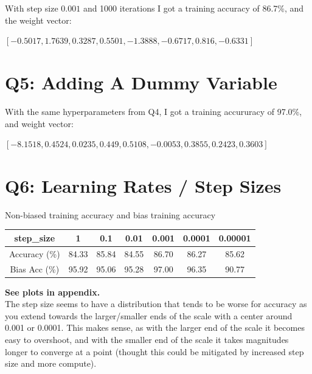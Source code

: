 \documentclass{article}
\begin{document}
        With step size $0.001$ and 1000 iterations I got a training accuracy of 86.7\%, and the weight vector: 
        \begin{center}
            $[-0.5017, 1.7639, 0.3287, 0.5501, -1.3888, -0.6717, 0.816, -0.6331]$
        \end{center}

    \section*{Q5: Adding A Dummy Variable}

        With the same hyperparameters from Q4, I got a training accururacy of 97.0\%, and weight vector:
        \begin{center}
            $[-8.1518, 0.4524, 0.0235, 0.449, 0.5108, -0.0053, 0.3855, 0.2423, 0.3603]$
        \end{center}

    \clearpage
    \section*{Q6: Learning Rates / Step Sizes}
        
        \begin{center}
            Non-biased training accuracy and bias training accuracy
            \\
            \begin{tabular}{|c|c|c|c|c|c|c|}
                    \hline
                    step\_size& 1&0.1&0.01&0.001&0.0001&0.00001\\
                    \hline
                    Accuracy (\%)&84.33&85.84&84.55&86.70&86.27&85.62\\
                    \hline
                    Bias Acc (\%)&95.92&95.06&95.28&97.00&96.35&90.77\\
                    \hline
            \end{tabular}
        \end{center}
        \textbf{See plots in appendix.}\\
        The step size seems to have a distribution that tends to be worse for accuracy as you extend towards the 
        larger/smaller ends of the scale with a center around 0.001 or 0.0001. 
        This makes sense, as with the larger end of the scale it becomes easy to overshoot, 
        and with the smaller end of the scale it takes magnitudes longer to converge at a point (thought this could be mitigated by increased step size and more compute).
\end{document}
